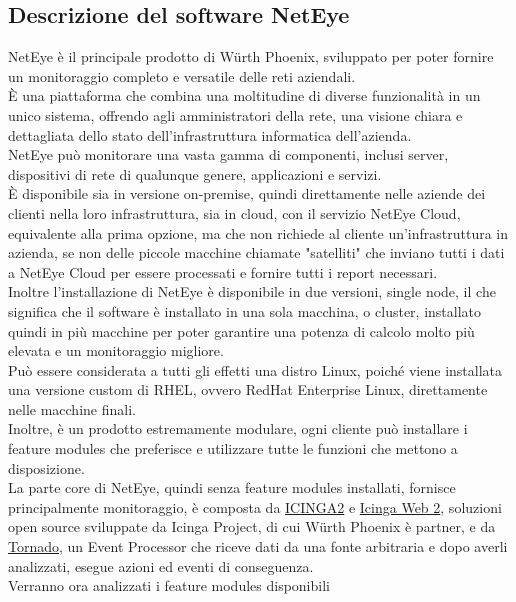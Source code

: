 \subsection{Descrizione del software NetEye}
\label{sub:neteye} NetEye è il principale prodotto di Würth Phoenix, sviluppato
per poter fornire un monitoraggio completo e versatile delle reti aziendali.\\ È
una piattaforma che combina una moltitudine di diverse funzionalità in un unico
sistema, offrendo agli amministratori della rete, una visione chiara e
dettagliata dello stato dell'infrastruttura informatica dell'azienda.\\ NetEye
può monitorare una vasta gamma di componenti, inclusi server, dispositivi di
rete di qualunque genere, applicazioni e servizi.\\ È disponibile sia in versione
on-premise, quindi direttamente nelle aziende dei clienti nella loro
infrastruttura, sia in cloud, con il servizio NetEye Cloud, equivalente alla prima
opzione, ma che non richiede al cliente un'infrastruttura in azienda, se non delle
piccole macchine chiamate "satelliti" che inviano tutti i dati a NetEye Cloud per
essere processati e fornire tutti i report necessari.\\ Inoltre l'installazione di
NetEye è disponibile in due versioni, single node, il che significa che il software
è installato in una sola macchina, o cluster, installato quindi in più macchine per
poter garantire una potenza di calcolo molto più elevata e un monitoraggio migliore.\\
Può essere considerata a tutti gli effetti una distro Linux, poiché viene
installata una versione custom di RHEL, ovvero RedHat Enterprise Linux,
direttamente nelle macchine finali.\\ Inoltre, è un prodotto estremamente modulare,
ogni cliente può installare i feature modules che preferisce e utilizzare tutte
le funzioni che mettono a disposizione.\\ La parte core di NetEye, quindi senza feature
modules installati, fornisce principalmente monitoraggio, è composta da \href{https://github.com/Icinga/icinga2}{ICINGA2}
e \href{https://github.com/Icinga/icingaweb2}{Icinga Web 2}, soluzioni open
source sviluppate da Icinga Project, di cui Würth Phoenix è partner, e da
\href{https://github.com/WuerthPhoenix/tornado}{Tornado}, un Event Processor che
riceve dati da una fonte arbitraria e dopo averli analizzati, esegue azioni ed
eventi di conseguenza.\\ Verranno ora analizzati i feature modules disponibili
